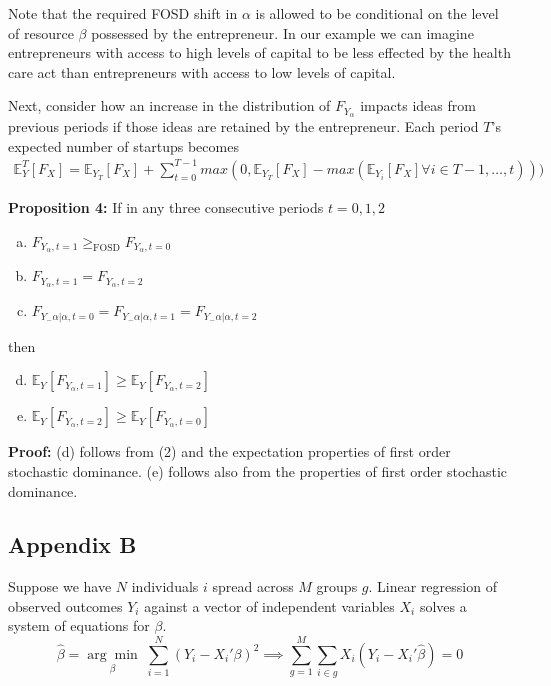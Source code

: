 \documentclass[12pt]{article}
\begin{document}
Note that the required FOSD shift in $\alpha$ is allowed to be conditional on the level of resource $\beta$ possessed by the entrepreneur. In our example we can imagine entrepreneurs with access to high levels of capital to be less effected by the health care act than entrepreneurs with access to low levels of capital.  

Next, consider how an increase in the distribution of $F_{Y_\alpha}$ impacts ideas from previous periods if those ideas are retained by the entrepreneur. Each period $T$'s expected number of startups becomes
\begin{align}
\mathbb{E}^T_Y[F_{X}] = \mathbb{E}_{Y_T}[F_{X}] + \sum_{t=0}^{T-1} max(0,\mathbb{E}_{Y_T}[F_{X}] - max(\mathbb{E}_{Y_i}[F_{X}] \forall i \in T{-}1,\dots,t)))
\end{align}

\textbf{Proposition 4:} If in any three consecutive periods $t=0,1,2$
\begin{enumerate}[(a)]
\item $F_{Y_\alpha,t=1} \mathop{\ge}_{\text{FOSD}} F_{Y_\alpha,t=0} $
\item $F_{Y_\alpha,t=1} = F_{Y_\alpha,t=2} $
\item $F_{Y_-\alpha|\alpha,t=0} = F_{Y_-\alpha|\alpha,t=1} =F_{Y_-\alpha|\alpha,t=2}$
\end{enumerate}
then
\begin{enumerate}[(a)]
\setcounter{enumi}{3}
\item $\mathbb{E}_{Y}[F_{Y_\alpha,t=1}] \ge \mathbb{E}_{Y}[F_{Y_\alpha,t=2}]$
\item $\mathbb{E}_{Y}[F_{Y_\alpha,t=2}] \ge \mathbb{E}_{Y}[F_{Y_\alpha,t=0}]$
\end{enumerate}

\textbf{Proof:} (d) follows from (2) and the expectation properties of first order stochastic dominance. (e) follows also from the properties of first order stochastic dominance.

\subsection*{Appendix B}

Suppose we have $N$ individuals $i$ spread across $M$ groups $g$. Linear regression of observed outcomes $Y_i$ against a vector of independent variables $X_i$ solves a system of equations for $\beta$. 
$$ \hat{\beta} = \underset{\beta}{\arg \min} \; \sum_{i=1}^{N} (Y_i - X_i' \beta)^2 \implies \sum_{g=1}^{M} \sum_{i \in g} X_i(Y_i - X_i' \hat{\beta}) = 0$$
\end{document}
